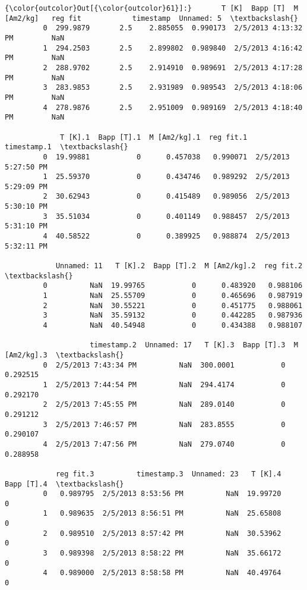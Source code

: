\documentclass{article}
\begin{document}
            \begin{Verbatim}[commandchars=\\\{\}]
{\color{outcolor}Out[{\color{outcolor}61}]:}       T [K]  Bapp [T]  M [Am2/kg]   reg fit            timestamp  Unnamed: 5  \textbackslash{}
         0  299.9879       2.5    2.885055  0.990173  2/5/2013 4:13:32 PM         NaN   
         1  294.2503       2.5    2.899802  0.989840  2/5/2013 4:16:42 PM         NaN   
         2  288.9702       2.5    2.914910  0.989691  2/5/2013 4:17:28 PM         NaN   
         3  283.9853       2.5    2.931989  0.989543  2/5/2013 4:18:06 PM         NaN   
         4  278.9876       2.5    2.951009  0.989169  2/5/2013 4:18:40 PM         NaN   
         
             T [K].1  Bapp [T].1  M [Am2/kg].1  reg fit.1          timestamp.1  \textbackslash{}
         0  19.99881           0      0.457038   0.990071  2/5/2013 5:27:50 PM   
         1  25.59370           0      0.434746   0.989292  2/5/2013 5:29:09 PM   
         2  30.62943           0      0.415489   0.989056  2/5/2013 5:30:10 PM   
         3  35.51034           0      0.401149   0.988457  2/5/2013 5:31:10 PM   
         4  40.58522           0      0.389925   0.988874  2/5/2013 5:32:11 PM   
         
            Unnamed: 11   T [K].2  Bapp [T].2  M [Am2/kg].2  reg fit.2  \textbackslash{}
         0          NaN  19.99765           0      0.483920   0.988106   
         1          NaN  25.55709           0      0.465696   0.987919   
         2          NaN  30.55221           0      0.451775   0.988061   
         3          NaN  35.59132           0      0.442285   0.987936   
         4          NaN  40.54948           0      0.434388   0.988107   
         
                    timestamp.2  Unnamed: 17   T [K].3  Bapp [T].3  M [Am2/kg].3  \textbackslash{}
         0  2/5/2013 7:43:34 PM          NaN  300.0001           0      0.292515   
         1  2/5/2013 7:44:54 PM          NaN  294.4174           0      0.292170   
         2  2/5/2013 7:45:55 PM          NaN  289.0140           0      0.291212   
         3  2/5/2013 7:46:57 PM          NaN  283.8555           0      0.290107   
         4  2/5/2013 7:47:56 PM          NaN  279.0740           0      0.288958   
         
            reg fit.3          timestamp.3  Unnamed: 23   T [K].4  Bapp [T].4  \textbackslash{}
         0   0.989795  2/5/2013 8:53:56 PM          NaN  19.99720           0   
         1   0.989635  2/5/2013 8:56:51 PM          NaN  25.65808           0   
         2   0.989510  2/5/2013 8:57:42 PM          NaN  30.53962           0   
         3   0.989398  2/5/2013 8:58:22 PM          NaN  35.66172           0   
         4   0.989000  2/5/2013 8:58:58 PM          NaN  40.49764           0   
         

\end{Verbatim}
\end{document}
